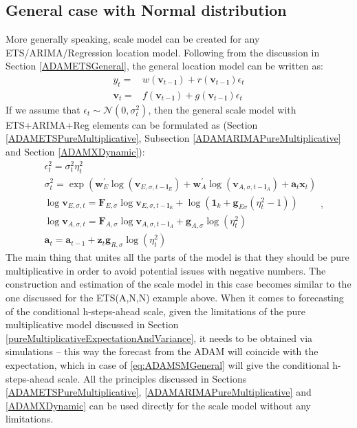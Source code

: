 \documentclass[]{book}
\theoremstyle{definition}
\theoremstyle{definition}
\theoremstyle{definition}
\theoremstyle{definition}
\theoremstyle{remark}
\begin{document}
\hypertarget{general-case-with-normal-distribution}{%
\subsection{General case with Normal distribution}\label{general-case-with-normal-distribution}}

More generally speaking, scale model can be created for any ETS/ARIMA/Regression location model. Following from the discussion in Section \ref{ADAMETSGeneral}, the general location model can be written as:
\begin{equation*}
  \begin{aligned}
    {y}_{t} = & w(\mathbf{v}_{t-\mathbf{l}}) + r(\mathbf{v}_{t-\mathbf{l}}) \epsilon_t \\
    \mathbf{v}_{t} = & f(\mathbf{v}_{t-\mathbf{l}}) + g(\mathbf{v}_{t-\mathbf{l}}) \epsilon_t
  \end{aligned}
\end{equation*}
If we assume that \(\epsilon_t \sim \mathcal{N}(0,\sigma^2_t)\), then the general scale model with ETS+ARIMA+Reg elements can be formulated as (Section \ref{ADAMETSPureMultiplicative}, Subsection \ref{ADAMARIMAPureMultiplicative} and Section \ref{ADAMXDynamic}):
\begin{equation}
  \begin{aligned}
        & \epsilon_t^2 = \sigma_t^2 \eta_{t}^2 \\
        & \sigma_t^2 = \exp \left(\mathbf{w}_E^\prime \log(\mathbf{v}_{E,\sigma,t-\mathbf{l}_E}) + \mathbf{w}_A^\prime \log(\mathbf{v}_{A,\sigma,t-\mathbf{l}_A}) + \mathbf{a}_t \mathbf{x}_t \right)\\
        & \log \mathbf{v}_{E,\sigma,t} = \mathbf{F}_{E,\sigma} \log \mathbf{v}_{E,\sigma,t-\mathbf{l}_E} + \log(\mathbf{1}_k + \mathbf{g}_{E\sigma} (\eta_t^2-1))\\
    & \log \mathbf{v}_{A,\sigma,t} = \mathbf{F}_{A,\sigma} \log \mathbf{v}_{A,\sigma,t-\mathbf{l}_A} + \mathbf{g}_{A,\sigma} \log(\eta_t^2) \\
    & \mathbf{a}_{t} = \mathbf{a}_{t-1} + \mathbf{z}_t \mathbf{g}_{R,\sigma} \log(\eta_t^2)
  \end{aligned},
  \label{eq:ADAMSMGeneral}
\end{equation}
The main thing that unites all the parts of the model is that they should be pure multiplicative in order to avoid potential issues with negative numbers. The construction and estimation of the scale model in this case becomes similar to the one discussed for the ETS(A,N,N) example above. When it comes to forecasting of the conditional h-steps-ahead scale, given the limitations of the pure multiplicative model discussed in Section \ref{pureMultiplicativeExpectationAndVariance}, it needs to be obtained via simulations -- this way the forecast from the ADAM will coincide with the expectation, which in case of \eqref{eq:ADAMSMGeneral} will give the conditional h-steps-ahead scale. All the principles discussed in Sections \ref{ADAMETSPureMultiplicative}, \ref{ADAMARIMAPureMultiplicative} and \ref{ADAMXDynamic} can be used directly for the scale model without any limitations.
\end{document}
